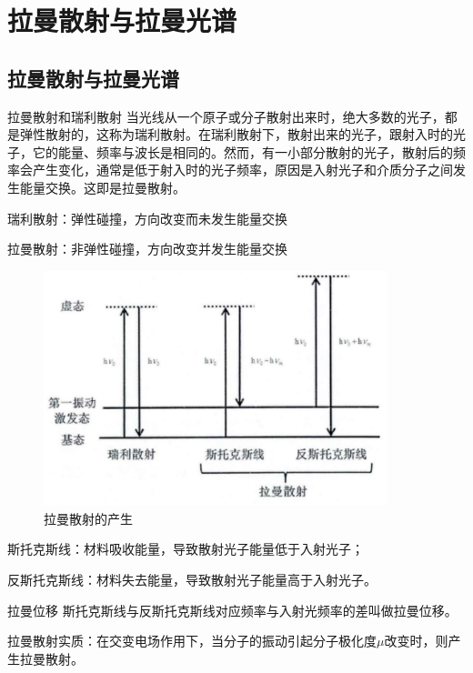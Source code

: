\section{拉曼散射与拉曼光谱}
\subsection{拉曼散射与拉曼光谱}
\begin{definition*}{拉曼散射和瑞利散射}
	当光线从一个原子或分子散射出来时，绝大多数的光子，都是弹性散射的，这称为瑞利散射。在瑞利散射下，散射出来的光子，跟射入时的光子，它的能量、频率与波长是相同的。然而，有一小部分散射的光子，散射后的频率会产生变化，通常是低于射入时的光子频率，原因是入射光子和介质分子之间发生能量交换。这即是拉曼散射。
\end{definition*}
\begin{note}
	瑞利散射：弹性碰撞，方向改变而未发生能量交换
	
	拉曼散射：非弹性碰撞，方向改变并发生能量交换
\end{note}
\begin{figure}[ht]
	\centering
	\includegraphics[width=10cm]{image/chp5_sers.png}
	\caption{拉曼散射的产生}
	\label{fig:chp5_laman}
\end{figure}
斯托克斯线：材料吸收能量，导致散射光子能量低于入射光子；

反斯托克斯线：材料失去能量，导致散射光子能量高于入射光子。
\begin{definition*}{拉曼位移}
	斯托克斯线与反斯托克斯线对应频率与入射光频率的差叫做拉曼位移。
\end{definition*}

拉曼散射实质：在交变电场作用下，当分子的振动引起分子极化度$\mu$改变时，则产生拉曼散射。

